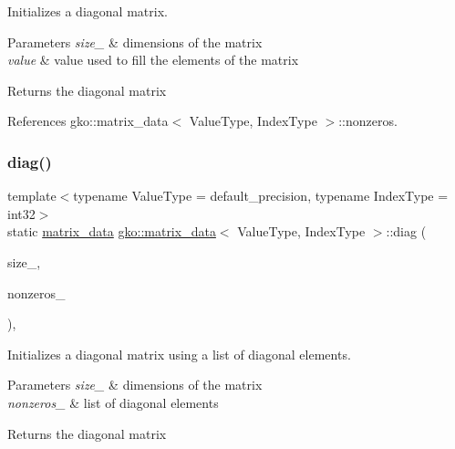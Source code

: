 Initializes a diagonal matrix. 


\begin{DoxyParams}{Parameters}
{\em size\+\_\+} & dimensions of the matrix \\
\hline
{\em value} & value used to fill the elements of the matrix\\
\hline
\end{DoxyParams}
\begin{DoxyReturn}{Returns}
the diagonal matrix 
\end{DoxyReturn}


References gko\+::matrix\+\_\+data$<$ Value\+Type, Index\+Type $>$\+::nonzeros.

\mbox{\label{structgko_1_1matrix__data_aa80c7201a72ebf5b79a793b8d38db8e2}} 
\subsubsection{\texorpdfstring{diag()}{diag()}\hspace{0.1cm}{\footnotesize\ttfamily [2/5]}}
{\footnotesize\ttfamily template$<$typename Value\+Type = default\+\_\+precision, typename Index\+Type = int32$>$ \\
static \hyperlink{structgko_1_1matrix__data}{matrix\+\_\+data} \hyperlink{structgko_1_1matrix__data}{gko\+::matrix\+\_\+data}$<$ Value\+Type, Index\+Type $>$\+::diag (\begin{DoxyParamCaption}\item[{\hyperlink{structgko_1_1dim}{dim}$<$ 2 $>$}]{size\+\_\+,  }\item[{std\+::initializer\+\_\+list$<$ Value\+Type $>$}]{nonzeros\+\_\+ }\end{DoxyParamCaption})\hspace{0.3cm}{\ttfamily [inline]}, {\ttfamily [static]}}



Initializes a diagonal matrix using a list of diagonal elements. 


\begin{DoxyParams}{Parameters}
{\em size\+\_\+} & dimensions of the matrix \\
\hline
{\em nonzeros\+\_\+} & list of diagonal elements\\
\hline
\end{DoxyParams}
\begin{DoxyReturn}{Returns}
the diagonal matrix 
\end{DoxyReturn}


